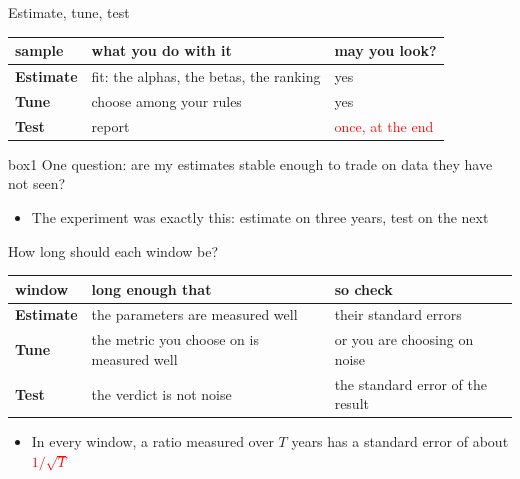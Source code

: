 \documentclass[aspectratio=169,10pt]{beamer}
\begin{document}
\begin{frame}{Estimate, tune, test}
\begin{center}
\renewcommand{\arraystretch}{1.6}
\begin{tabular}{lll}
\toprule
sample & what you do with it & may you look? \\
\midrule
\textbf{Estimate} & fit: the alphas, the betas, the ranking & yes \\
\textbf{Tune} & choose among your rules & yes \\
\textbf{Test} & report & \textcolor{red}{once, at the end} \\
\bottomrule
\end{tabular}
\end{center}
\vskip 12pt
\begin{beamercolorbox}[rounded=true,sep=8pt,center]{box1}
One question: are my estimates stable enough to trade on data they have not seen?
\end{beamercolorbox}
\vskip 8pt
\begin{itemize}
\item The experiment was exactly this: estimate on three years, test on the next
\end{itemize}
\end{frame}

\begin{frame}{How long should each window be?}
\begin{center}
\renewcommand{\arraystretch}{1.6}
\begin{tabular}{lll}
\toprule
window & long enough that & so check \\
\midrule
\textbf{Estimate} & the parameters are measured well & their standard errors \\
\textbf{Tune} & the metric you choose on is measured well & or you are choosing on noise \\
\textbf{Test} & the verdict is not noise & the standard error of the result \\
\bottomrule
\end{tabular}
\end{center}
\vskip 14pt
\begin{itemize}
\item In every window, a ratio measured over $T$ years has a standard error of about \textcolor{red}{$1/\sqrt{T}$}
\end{itemize}
\end{frame}
\end{document}

